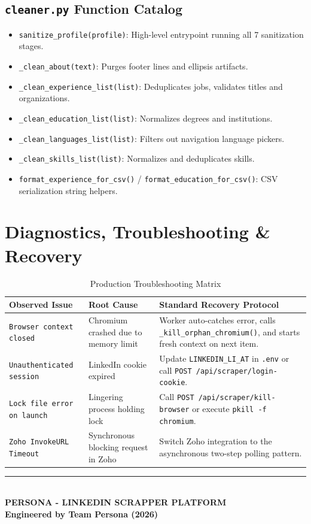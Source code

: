 \documentclass[11pt,a4paper]{report}
\begin{document}
\section{\texttt{cleaner.py} Function Catalog}
\begin{itemize}[leftmargin=*]
    \item \texttt{sanitize\_profile(profile)}: High-level entrypoint running all 7 sanitization stages.
    \item \texttt{\_clean\_about(text)}: Purges footer lines and ellipsis artifacts.
    \item \texttt{\_clean\_experience\_list(list)}: Deduplicates jobs, validates titles and organizations.
    \item \texttt{\_clean\_education\_list(list)}: Normalizes degrees and institutions.
    \item \texttt{\_clean\_languages\_list(list)}: Filters out navigation language pickers.
    \item \texttt{\_clean\_skills\_list(list)}: Normalizes and deduplicates skills.
    \item \texttt{format\_experience\_for\_csv()} / \texttt{format\_education\_for\_csv()}: CSV serialization string helpers.
\end{itemize}

\chapter{Diagnostics, Troubleshooting \& Recovery}

\begin{table}[h!]
\centering
\small
\begin{tabularx}{\textwidth}{l X X}
\toprule
\textbf{Observed Issue} & \textbf{Root Cause} & \textbf{Standard Recovery Protocol} \\
\midrule
\texttt{Browser context closed} & Chromium crashed due to memory limit & Worker auto-catches error, calls \texttt{\_kill\_orphan\_chromium()}, and starts fresh context on next item. \\
\texttt{Unauthenticated session} & LinkedIn cookie expired & Update \texttt{LINKEDIN\_LI\_AT} in \texttt{.env} or call \texttt{POST /api/scraper/login-cookie}. \\
\texttt{Lock file error on launch} & Lingering process holding lock & Call \texttt{POST /api/scraper/kill-browser} or execute \texttt{pkill -f chromium}. \\
\texttt{Zoho InvokeURL Timeout} & Synchronous blocking request in Zoho & Switch Zoho integration to the asynchronous two-step polling pattern. \\
\bottomrule
\end{tabularx}
\caption{Production Troubleshooting Matrix}
\label{tab:troubleshooting}
\end{table}

\vfill
\centering
\rule{\textwidth}{1pt}\\[0.3cm]
\textbf{PERSONA - LINKEDIN SCRAPPER PLATFORM}\\
\textbf{Engineered by Team Persona (2026)}
\end{document}
